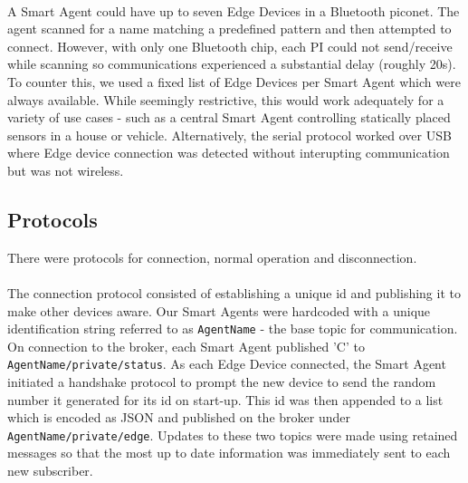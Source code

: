 \paragraph{}
A Smart Agent could have up to seven Edge Devices in a Bluetooth piconet. The agent scanned for a name matching a predefined pattern and then attempted to connect. However, with only one Bluetooth chip, each PI could not send/receive while scanning so communications experienced a substantial delay (roughly 20s). To counter this, we used a fixed list of Edge Devices per Smart Agent which were always available. While seemingly restrictive, this would work adequately for a variety of use cases - such as a central Smart Agent controlling statically placed sensors in a house or vehicle. Alternatively, the serial protocol worked over USB where Edge device connection was detected without interupting communication but was not wireless.


\subsection{Protocols}

There were protocols for connection, normal operation and disconnection.

\paragraph{} %
The connection protocol consisted of establishing a unique id and publishing it to make other devices aware. Our Smart Agents were hardcoded with a unique identification string referred to as \verb|AgentName| - the base topic for communication. On connection to the broker, each Smart Agent published 'C' to \verb|AgentName/private/status|. As each Edge Device connected, the Smart Agent initiated a handshake protocol to prompt the new device to send the random number it generated for its id on start-up. This id was then appended to a list which is encoded as JSON and published on the broker under \verb|AgentName/private/edge|. Updates to these two topics were made using retained messages so that the most up to date information was immediately sent to each new subscriber.

